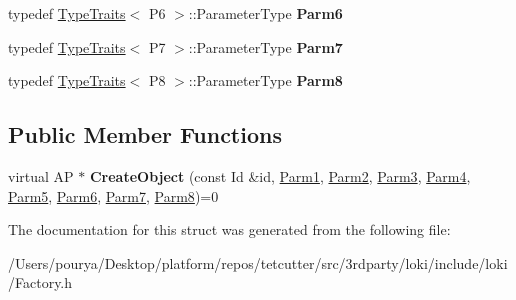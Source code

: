 \begin{DoxyCompactItemize}
\item 
\hypertarget{structLoki_1_1FactoryImpl_3_01AP_00_01Id_00_01LOKI__TYPELIST__8_07P1_00_01P2_00_01P3_00_01P4_00_116dd2045f78a9e7ca017de1cb74bcf4_a527659bd0f85627097130738dd304605}{}typedef \hyperlink{classLoki_1_1TypeTraits}{Type\+Traits}$<$ P6 $>$\+::Parameter\+Type {\bfseries Parm6}\label{structLoki_1_1FactoryImpl_3_01AP_00_01Id_00_01LOKI__TYPELIST__8_07P1_00_01P2_00_01P3_00_01P4_00_116dd2045f78a9e7ca017de1cb74bcf4_a527659bd0f85627097130738dd304605}

\item 
\hypertarget{structLoki_1_1FactoryImpl_3_01AP_00_01Id_00_01LOKI__TYPELIST__8_07P1_00_01P2_00_01P3_00_01P4_00_116dd2045f78a9e7ca017de1cb74bcf4_adf1a0ac2afa532e9a9b558c755a1078c}{}typedef \hyperlink{classLoki_1_1TypeTraits}{Type\+Traits}$<$ P7 $>$\+::Parameter\+Type {\bfseries Parm7}\label{structLoki_1_1FactoryImpl_3_01AP_00_01Id_00_01LOKI__TYPELIST__8_07P1_00_01P2_00_01P3_00_01P4_00_116dd2045f78a9e7ca017de1cb74bcf4_adf1a0ac2afa532e9a9b558c755a1078c}

\item 
\hypertarget{structLoki_1_1FactoryImpl_3_01AP_00_01Id_00_01LOKI__TYPELIST__8_07P1_00_01P2_00_01P3_00_01P4_00_116dd2045f78a9e7ca017de1cb74bcf4_a4d02aa30d3ae67b4c779e011ecfb29b2}{}typedef \hyperlink{classLoki_1_1TypeTraits}{Type\+Traits}$<$ P8 $>$\+::Parameter\+Type {\bfseries Parm8}\label{structLoki_1_1FactoryImpl_3_01AP_00_01Id_00_01LOKI__TYPELIST__8_07P1_00_01P2_00_01P3_00_01P4_00_116dd2045f78a9e7ca017de1cb74bcf4_a4d02aa30d3ae67b4c779e011ecfb29b2}

\end{DoxyCompactItemize}
\subsection*{Public Member Functions}
\begin{DoxyCompactItemize}
\item 
\hypertarget{structLoki_1_1FactoryImpl_3_01AP_00_01Id_00_01LOKI__TYPELIST__8_07P1_00_01P2_00_01P3_00_01P4_00_116dd2045f78a9e7ca017de1cb74bcf4_a2778632c13cc6a047ae2d1bb0b9fa514}{}virtual A\+P $\ast$ {\bfseries Create\+Object} (const Id \&id, \hyperlink{classLoki_1_1EmptyType}{Parm1}, \hyperlink{classLoki_1_1EmptyType}{Parm2}, \hyperlink{classLoki_1_1EmptyType}{Parm3}, \hyperlink{classLoki_1_1EmptyType}{Parm4}, \hyperlink{classLoki_1_1EmptyType}{Parm5}, \hyperlink{classLoki_1_1EmptyType}{Parm6}, \hyperlink{classLoki_1_1EmptyType}{Parm7}, \hyperlink{classLoki_1_1EmptyType}{Parm8})=0\label{structLoki_1_1FactoryImpl_3_01AP_00_01Id_00_01LOKI__TYPELIST__8_07P1_00_01P2_00_01P3_00_01P4_00_116dd2045f78a9e7ca017de1cb74bcf4_a2778632c13cc6a047ae2d1bb0b9fa514}

\end{DoxyCompactItemize}


The documentation for this struct was generated from the following file\+:\begin{DoxyCompactItemize}
\item 
/\+Users/pourya/\+Desktop/platform/repos/tetcutter/src/3rdparty/loki/include/loki/Factory.\+h\end{DoxyCompactItemize}
